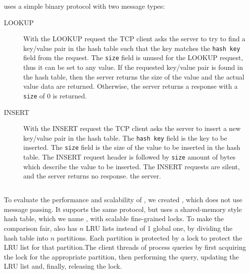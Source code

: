 \cpserver{} uses a simple binary protocol with two message types:
\begin{description}

\item[LOOKUP] With the LOOKUP request the TCP client asks the server to try to
  find a key/value pair in the hash table such that the key matches the
  \texttt{hash key} field from the request. The \texttt{size} field is unused
  for the LOOKUP request, thus it can be set to any value.  If the requested
  key/value pair is found in the hash table, then the server returns the size of
  the value and the actual value data are returned.  Otherwise, the server
  returns a response with a \texttt{size} of 0 is returned.

\item[INSERT] With the INSERT request the TCP client asks the server to insert a
  new key/value pair in the hash table.  The \texttt{hash key} field is the key
  to be inserted. The \texttt{size} field is the size of the value to be
  inserted in the hash table.  The INSERT request header is followed by
  \texttt{size} amount of bytes which describe the value to be inserted. The
  INSERT requests are silent, and the server returns no response.
  the server.

\end{description}

\subsection{\lockserver{}}

To evaluate the performance and scalability of \cphash{}, we created
\lockserver{}, which does not use message passing. It supports the same
protocol, but uses a shared-memory style hash table, which we name
\lockhash{}, with scalable fine-grained locks.  To make the comparison fair,
\lockhash{} also has $n$ LRU lists instead of 1 global one, by dividing the hash
table into $n$ partitions.  Each partition is protected by a lock to protect the
LRU list for that partition.The client threads of \lockserver{} process queries
by first acquiring the lock for the appropriate partition, then performing the
query, updating the LRU list and, finally, releasing the lock.  

